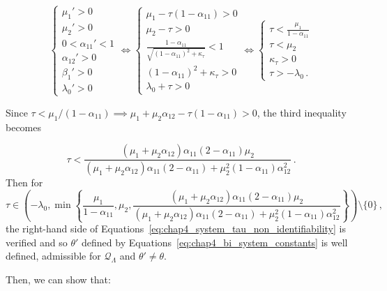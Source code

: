\begin{subappendices}
\begin{itemize}
\begin{equation}\label{eq:chap4_system_tau_non_identifiability}
\begin{cases}
  \mu_1' > 0\\
  \mu_2' > 0\\
  0 < \alpha_{11}' < 1\\
  \alpha_{12}' > 0\\
  \beta_1' > 0\\
  \lambda_0' >0
\end{cases}\iff
\begin{cases}
  \mu_1 - \tau(1-\alpha_{11}) > 0\\
  \mu_2 - \tau > 0\\
  \frac{1-\alpha_{11}}{\sqrt{(1-\alpha_{11})^2 + \kappa_\tau}} < 1\\
  (1-\alpha_{11})^2 + \kappa_\tau > 0\\
  \lambda_0 + \tau > 0
\end{cases}\iff
\begin{cases}
  \tau < \frac{\mu_1}{1-\alpha_{11}}\\
  \tau < \mu_2\\
  \kappa_\tau > 0\\
  \tau > -\lambda_0\,.
\end{cases}
\end{equation}

Since $\tau < \mu_1/(1-\alpha_{11}) \implies \mu_1 + \mu_2 \alpha_{12} - \tau(1-\alpha_{11}) > 0$, the third inequality becomes

\[
\tau < \frac{(\mu_1 + \mu_2 \alpha_{12})\alpha_{11}(2-\alpha_{11})\mu_2}{(\mu_1 + \mu_2 \alpha_{12})\alpha_{11}(2-\alpha_{11}) + \mu_2^2(1-\alpha_{11}) \alpha_{12}^2}\,.
\]
Then for 
\[\tau \in \left(-\lambda_0, \min\left\{\frac{\mu_1}{1-\alpha_{11}}, \mu_2,  \frac{(\mu_1 + \mu_2 \alpha_{12})\alpha_{11}(2-\alpha_{11})\mu_2}{(\mu_1 + \mu_2 \alpha_{12})\alpha_{11}(2-\alpha_{11}) + \mu_2^2(1-\alpha_{11}) \alpha_{12}^2} \right\} \right)\setminus\{0\}\,,\]
the right-hand side of Equations~\eqref{eq:chap4_system_tau_non_identifiability} is verified and so $\theta'$ defined by Equations~\eqref{eq:chap4_bi_system_constants} is well defined, admissible for $\mathcal Q_\Lambda$ and $\theta' \neq \theta$.

Then, we can show that:


\end{itemize}
\end{subappendices}
